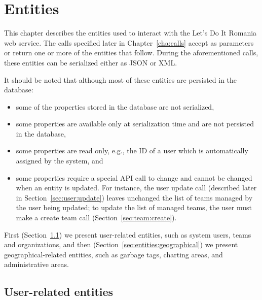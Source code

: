 \chapter{Entities}
\label{cha:entities}

This chapter describes the entities used to interact with the Let's Do It
Romania web service. The calls specified later in Chapter~\ref{cha:calls} accept
as parameters or return one or more of the entities that follow. During the
aforementioned calls, these entities can be serialized either as JSON or XML.

It should be noted that although most of these entities are persisted in the
database:
\begin{itemize}
  \item some of the properties stored in the database are not serialized,
  \item some properties are available only at serialization time and are not
    persisted in the database,
  \item some properties are read only, e.g., the ID of a user which is
    automatically assigned by the system, and
  \item some properties require a special API call to change and cannot be
    changed when an entity is updated. For instance, the user update call
    (described later in Section~\ref{sec:user:update}) leaves unchanged the list
    of teams managed by the user being updated; to update the list of managed
    teams, the user must make a create team call
    (Section~\ref{sec:team:create}). 
\end{itemize}

First (Section~\ref{sec:entities:user}) we present user-related entities, such
as system users, teams and organizations, and then
(Section~\ref{sec:entities:geographical}) we present geographical-related
entities, such as garbage tags, charting areas, and administrative areas.

\section{User-related entities}
\label{sec:entities:user}

